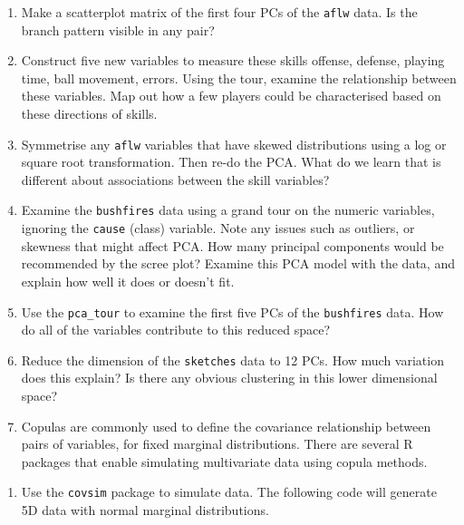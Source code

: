 \documentclass[
  letterpaper,
]{krantz}
\providecommand{\tightlist}{%
  \setlength{\itemsep}{0pt}\setlength{\parskip}{0pt}}\usepackage{longtable,booktabs,array}
\begin{document}
\begin{enumerate}
\def\labelenumi{\arabic{enumi}.}
\tightlist
\item
  Make a scatterplot matrix of the first four PCs of the \texttt{aflw}
  data. Is the branch pattern visible in any pair?
\item
  Construct five new variables to measure these skills offense, defense,
  playing time, ball movement, errors. Using the tour, examine the
  relationship between these variables. Map out how a few players could
  be characterised based on these directions of skills.
\item
  Symmetrise any \texttt{aflw} variables that have skewed distributions
  using a log or square root transformation. Then re-do the PCA. What do
  we learn that is different about associations between the skill
  variables?
\item
  Examine the \texttt{bushfires} data using a grand tour on the numeric
  variables, ignoring the \texttt{cause} (class) variable. Note any
  issues such as outliers, or skewness that might affect PCA. How many
  principal components would be recommended by the scree plot? Examine
  this PCA model with the data, and explain how well it does or doesn't
  fit.
\item
  Use the \texttt{pca\_tour} to examine the first five PCs of the
  \texttt{bushfires} data. How do all of the variables contribute to
  this reduced space?
\item
  Reduce the dimension of the \texttt{sketches} data to 12 PCs. How much
  variation does this explain? Is there any obvious clustering in this
  lower dimensional space?
\item
  Copulas are commonly used to define the covariance relationship
  between pairs of variables, for fixed marginal distributions. There
  are several R packages that enable simulating multivariate data using
  copula methods.
\end{enumerate}

\begin{enumerate}
\def\labelenumi{\alph{enumi}.}
\tightlist
\item
  Use the \texttt{covsim} package to simulate data. The following code
  will generate 5D data with normal marginal distributions.
\end{enumerate}
\end{document}
